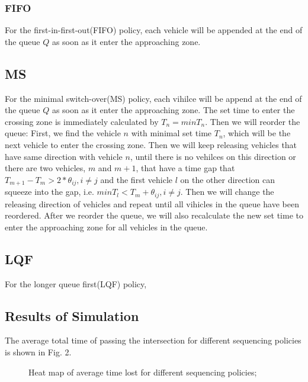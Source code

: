\documentclass{article}
\begin{document}
\subsubsection{FIFO}
For the first-in-first-out(FIFO) policy, each vehicle will be appended at the end of the queue $Q$ as soon as it enter the approaching zone. 



\subsection{MS}

For the minimal switch-over(MS) policy, each vihilce will be append at the end of the queue $Q$ as soon as it enter the approaching zone. The set time to enter the crossing zone is immediately calculated by $T_n=minT_n$. Then we will reorder the queue: First, we find the vehicle $n$ with minimal set time $T_n$, which will be the next vehicle to enter the crossing zone. Then we will keep releasing vehicles that have same direction with vehicle $n$, until there is no vehilces on this direction or there are two vehicles, $m$ and $m+1$, that have a time gap that  $T_{m+1}-T_m>2*\theta_{ij}, i \neq j$ and the first vehicle $l$ on the other direction can squeeze into the gap, i.e. $minT_l<T_m+\theta_{ij}, i \neq j$. Then we will change the releasing direction of vehicles and repeat until all vihicles in the queue have been reordered. After we reorder the queue, we will also recalculate the new set time to enter the approaching zone for all vehicles in the queue. 

\subsection{LQF}
For the longer queue first(LQF) policy, 

\subsection{Results of Simulation}
The average total time of passing the intersection for different sequencing policies is shown in Fig. 2. 
\begin{figure}
 \centering
 \hspace{0.02in}
 \hspace{0.02in}
 \caption{Heat map of average time lost for different sequencing policies;}
 \label{fig:SUMO_results} 
\end{figure}
\end{document}
